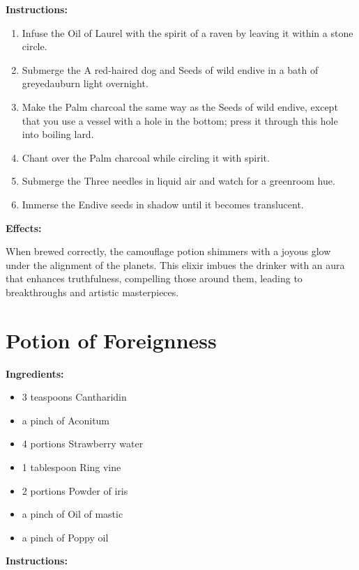 \documentclass{article}
\begin{document}
\textbf{Instructions:}

\begin{enumerate}
  \item Infuse the Oil of Laurel with the spirit of a raven by leaving it within a stone circle.
  \item Submerge the A red-haired dog and Seeds of wild endive in a bath of greyedauburn light overnight.
  \item Make the Palm charcoal the same way as the Seeds of wild endive, except that you use a vessel with a hole in the bottom; press it through this hole into boiling lard.
  \item Chant over the Palm charcoal while circling it with spirit.
  \item Submerge the Three needles in liquid air and watch for a greenroom hue.
  \item Immerse the Endive seeds in shadow until it becomes translucent.
\end{enumerate}

\textbf{Effects:}

When brewed correctly, the camouflage potion shimmers with a joyous glow under the alignment of the planets. This elixir imbues the drinker with an aura that enhances truthfulness, compelling those around them, leading to breakthroughs and artistic masterpieces.

\newpage
\section*{Potion of Foreignness}

\textbf{Ingredients:}

\begin{itemize}
  \item 3 teaspoons Cantharidin
  \item a pinch of Aconitum
  \item 4 portions Strawberry water
  \item 1 tablespoon Ring vine
  \item 2 portions Powder of iris
  \item a pinch of Oil of mastic
  \item a pinch of Poppy oil
\end{itemize}

\textbf{Instructions:}
\end{document}
